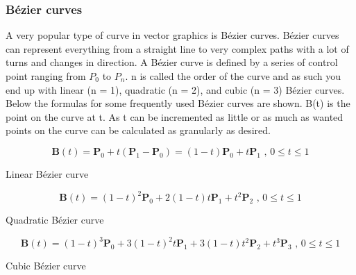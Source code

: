 \subsubsection{Bézier curves}
\label{sec:bezier}
A very popular type of curve in vector graphics is Bézier curves.
Bézier curves can represent everything from a straight line to very complex paths with a lot of turns and changes in direction.
A Bézier curve is defined by a series of control point ranging from \(P_0\) to \(P_n\). 
n is called the order of the curve and as such you end up with linear (n = 1), quadratic (n = 2), and cubic (n = 3) Bézier curves.
Below the formulas for some frequently used Bézier curves are shown. B(t) is the point on the curve at t.
As t can be incremented as little or as much as wanted points on the curve can be calculated as granularly as desired.

\begin{cequation}[H]
	\begin{equation*}
		\mathbf{B}(t)=\mathbf{P}_0 + t(\mathbf{P}_1-\mathbf{P}_0)=(1-t)\mathbf{P}_0 + t\mathbf{P}_1 \mbox{ , } 0 \le t \le 1
	\end{equation*}
	\caption{Linear Bézier curve}
\end{cequation}

\begin{cequation}[H]
	\begin{equation*}
		\mathbf{B}(t) = (1 - t)^{2}\mathbf{P}_0 + 2(1 - t)t\mathbf{P}_1 + t^{2}\mathbf{P}_2 \mbox{ , } 0 \le t \le 1
	\end{equation*}
	\caption{Quadratic Bézier curve}
\end{cequation}

\begin{cequation}[H]
	\begin{equation*}
		\mathbf{B}(t)=(1-t)^3\mathbf{P}_0+3(1-t)^2t\mathbf{P}_1+3(1-t)t^2\mathbf{P}_2+t^3\mathbf{P}_3 \mbox{ , } 0 \le t \le 1
	\end{equation*}
	\caption{Cubic Bézier curve}
\end{cequation}
